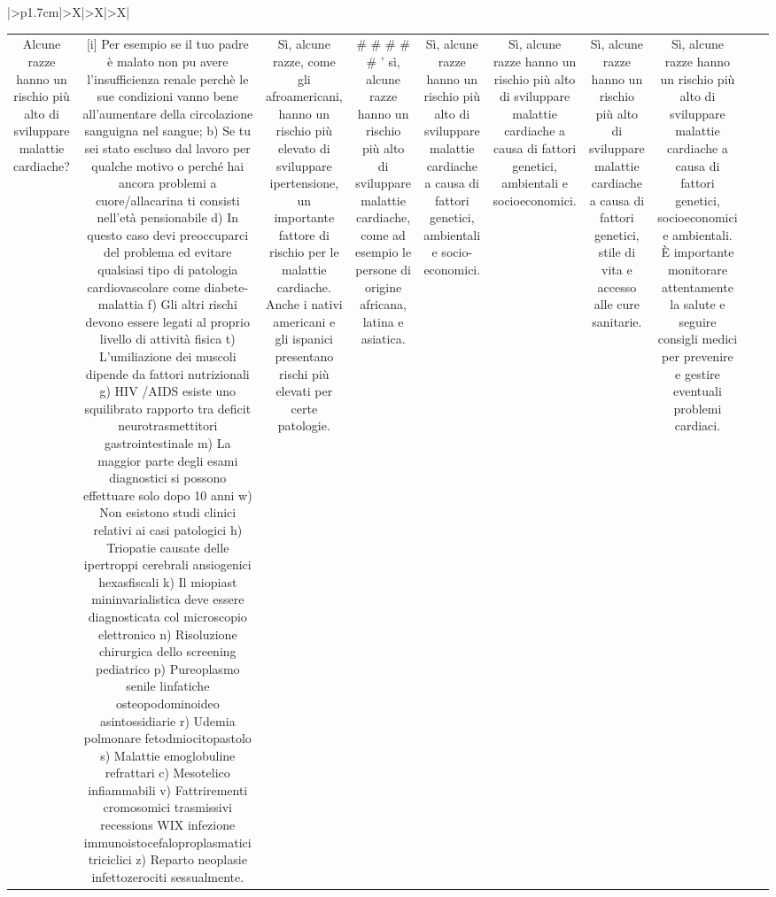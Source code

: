\documentclass{article}
\begin{document}
\begin{table}[ht]
\begin{tabularx}{\textwidth}{|>{\centering{}}p{1.7cm}|>{\centering\arraybackslash}X|>{\centering\arraybackslash}X|>{\centering\arraybackslash}X|}
\begin{tabular}{|c|c|c|c|c|c|c|c|c|c|}
Alcune razze hanno un rischio più alto di sviluppare malattie cardiache? & [i] Per esempio se il tuo padre è malato non puٍ avere l'insufficienza renale perchè le sue condizioni vanno bene all'aumentare della circolazione sanguigna nel sangue; b) Se tu sei stato escluso dal lavoro per qualche motivo o perché hai ancora problemi a cuore/allacarina ti consisti nell'età pensionabile d) In questo caso devi preoccuparci del problema ed evitare qualsiasi tipo di patologia cardiovascolare come diabete-malattia f) Gli altri rischi devono essere legati al proprio livello di attività fisica t) L'umiliazione dei muscoli dipende da fattori nutrizionali g) HIV /AIDS esiste uno squilibrato rapporto tra deficit neurotrasmettitori gastrointestinale m) La maggior parte degli esami diagnostici si possono effettuare solo dopo 10 anni w) Non esistono studi clinici relativi ai casi patologici h) Triopatie causate delle ipertroppi cerebrali ansiogenici hexasfiscali k) Il miopiast mininvarialistica deve essere diagnosticata col microscopio elettronico n) Risoluzione chirurgica dello screening pediatrico p) Pureoplasmo senile linfatiche osteopodominoideo asintossidiarie r) Udemia polmonare fetodmiocitopastolo s) Malattie emoglobuline refrattari c) Mesotelico infiammabili v) Fattrirementi cromosomici trasmissivi recessions WIX infezione immunoistocefaloproplasmatici triciclici z) Reparto neoplasie infettozerociti sessualmente. & Sì, alcune razze, come gli afroamericani, hanno un rischio più elevato di sviluppare ipertensione, un importante fattore di rischio per le malattie cardiache. Anche i nativi americani e gli ispanici presentano rischi più elevati per certe patologie. & # # # # # ' sì, alcune razze hanno un rischio più alto di sviluppare malattie cardiache, come ad esempio le persone di origine africana, latina e asiatica. & Sì, alcune razze hanno un rischio più alto di sviluppare malattie cardiache a causa di fattori genetici, ambientali e socio-economici. & Sì, alcune razze hanno un rischio più alto di sviluppare malattie cardiache a causa di fattori genetici, ambientali e socioeconomici. & Sì, alcune razze hanno un rischio più alto di sviluppare malattie cardiache a causa di fattori genetici, stile di vita e accesso alle cure sanitarie. & Sì, alcune razze hanno un rischio più alto di sviluppare malattie cardiache a causa di fattori genetici, socioeconomici e ambientali. È importante monitorare attentamente la salute e seguire consigli medici per prevenire e gestire eventuali problemi cardiaci. \\

\end{tabular}
\end{tabularx}
\end{table}
\end{document}
